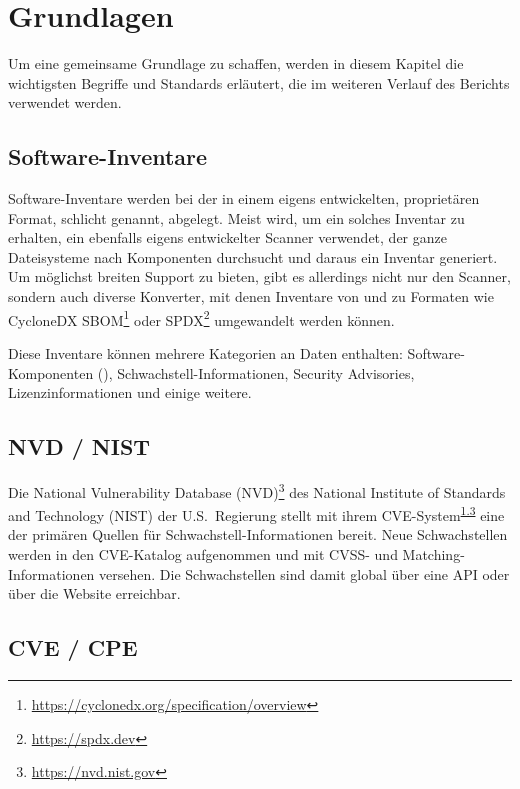 \section{Grundlagen} \label{sec:projektbericht-grundlagen}

Um eine gemeinsame Grundlage zu schaffen, werden in diesem Kapitel die wichtigsten Begriffe und Standards erläutert, die im weiteren Verlauf des Berichts verwendet werden.

\subsection{Software-Inventare} \label{subsec:projektbericht-grundlagen-inventories}

Software-Inventare werden bei der {\metaeffekt} in einem eigens entwickelten, proprietären Format, schlicht  genannt, abgelegt.
Meist wird, um ein solches Inventar zu erhalten, ein ebenfalls eigens entwickelter Scanner verwendet, der ganze Dateisysteme nach Komponenten durchsucht und daraus ein Inventar generiert.
Um möglichst breiten Support zu bieten, gibt es allerdings nicht nur den Scanner, sondern auch diverse Konverter, mit denen Inventare von und zu Formaten wie CycloneDX SBOM\footnote{\url{https://cyclonedx.org/specification/overview}} oder SPDX\footnote{\url{https://spdx.dev}} umgewandelt werden können.

Diese Inventare können mehrere Kategorien an Daten enthalten: Software-Komponenten (), Schwachstell-Informationen, Security Advisories, Lizenzinformationen und einige weitere.

\subsection{NVD / NIST} \label{subsec:projektbericht-grundlagen-nvd-nist}

Die National Vulnerability Database (NVD)\footnote{\url{https://nvd.nist.gov}} des National Institute of Standards and Technology (NIST) der U.S.\ Regierung stellt mit ihrem CVE-System\textsuperscript{\ref{subsec:projektbericht-grundlagen-cve-cpe}} eine der primären Quellen für Schwachstell-Informationen bereit.
Neue Schwachstellen werden in den CVE-Katalog aufgenommen und mit CVSS- und Matching-Informationen versehen.
Die Schwachstellen sind damit global über eine API oder über die Website erreichbar.

\subsection{CVE / CPE} \label{subsec:projektbericht-grundlagen-cve-cpe}

